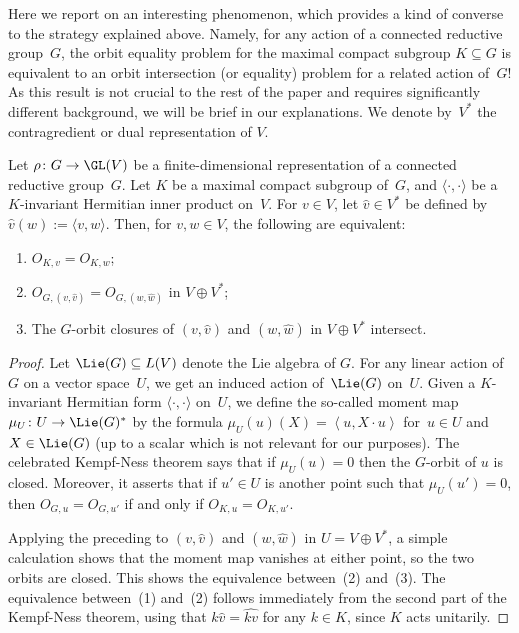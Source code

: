 Here we report on an interesting phenomenon, which provides a kind of converse to the strategy explained above.
Namely, for any action of a connected reductive group~$G$, the orbit equality problem for the maximal compact subgroup $K\subseteq G$ is equivalent to an orbit intersection (or equality) problem for a related action of~$G$!
As this result is not crucial to the rest of the paper and requires significantly different background, we will be brief in our explanations.
We denote by~$V^*$ the contragredient or dual representation of $V$.

\begin{theorem}\label{thm:compacttogeneral}
Let $\rho\colon G \to \GL(V)$ be a finite-dimensional representation of a connected reductive group~$G$.
Let $K$ be a maximal compact subgroup of~$G$, and $\langle\cdot,\cdot\rangle$ be a $K$-invariant Hermitian inner product on~$V$.
For $v \in V$, let $\widehat{v} \in V^*$ be defined by~$\widehat{v}(w) := \langle v,w\rangle$.
Then, for $v,w \in V$, the following are equivalent:
\begin{enumerate}
\item $O_{K,v} = O_{K,w}$;
\item $O_{G,(v,\widehat{v})} = O_{G,(w,\widehat{w})}$ in $V \oplus V^*$;
\item The $G$-orbit closures of $(v,\widehat{v})$ and $(w,\widehat{w})$ in $V \oplus V^*$ intersect.
\end{enumerate}
\end{theorem}

\begin{proof}
Let $\Lie(G) \subseteq L(V)$ denote the Lie algebra of $G$.
For any linear action of~$G$ on a vector space~$U$, we get an induced action of~$\Lie(G)$ on~$U$.
Given a $K$-invariant Hermitian form $\langle\cdot,\cdot\rangle$ on~$U$, we define
the so-called moment map $\mu_U \colon U \rightarrow \Lie(G)^*$ by the formula $\mu_U(u)(X) = \left<u, X \cdot u\right>$ for~$u \in U$ and~$X \in \Lie(G)$ (up to a scalar which is not relevant for our purposes).
The celebrated Kempf-Ness theorem says that if $\mu_U(u) = 0$ then the $G$-orbit of $u$ is closed.
Moreover, it asserts that if $u'\in U$ is another point such that $\mu_U(u') = 0$, then $O_{G,u} = O_{G,u'}$ if and only if $O_{K,u} = O_{K,u'}$.

Applying the preceding to $(v,\widehat{v})$ and $(w,\widehat{w})$ in $U = V \oplus V^*$, a simple calculation shows that the moment map vanishes at either point, so the two orbits are closed.
This shows the equivalence between~(2) and~(3).
The equivalence between~(1) and~(2) follows immediately from the second part of the Kempf-Ness theorem, using that $k \widehat v = \widehat{k v}$ for any $k\in K$, since $K$ acts unitarily.
\end{proof}



